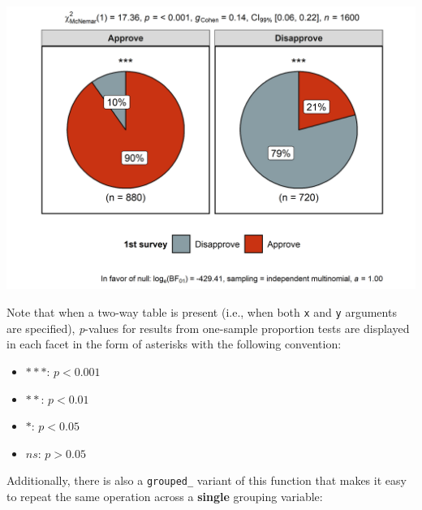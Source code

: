 \documentclass[]{article}
\providecommand{\tightlist}{%
  \setlength{\itemsep}{0pt}\setlength{\parskip}{0pt}}
\begin{document}
\includegraphics[width=1\linewidth]{./figures/paper-ggpiestats3-1}

Note that when a two-way table is present (i.e., when both \texttt{x}
and \texttt{y} arguments are specified), \emph{p}-values for results
from one-sample proportion tests are displayed in each facet in the form
of asterisks with the following convention:

\begin{itemize}
\tightlist
\item
  \(***\): \(p < 0.001\)
\item
  \(**\): \(p < 0.01\)
\item
  \(*\): \(p < 0.05\)
\item
  \(ns\): \(p > 0.05\)
\end{itemize}

Additionally, there is also a \texttt{grouped\_} variant of this
function that makes it easy to repeat the same operation across a
\textbf{single} grouping variable:
\end{document}
